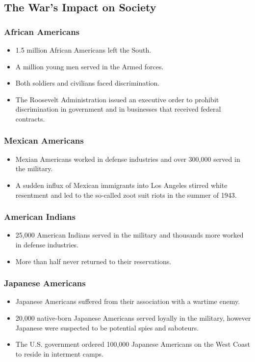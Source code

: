 \documentclass[12pt]{article} %
\begin{document}
	\subsection{The War's Impact on Society}

	\subsubsection{African Americans}
	\begin{itemize}
		\item 1.5 million African Americans left the South.
		\item A million young men served in the Armed forces.
		\item Both soldiers and civilians faced discrimination.
		\item The Roosevelt Administration issued an executive order to prohibit discrimination in government
			and in businesses that received federal contracts.
	\end{itemize}

	\subsubsection{Mexican Americans}
	\begin{itemize}
		\item Mexian Americans worked in defense industries and over 300,000 served in the military.
		\item A sudden influx of Mexican immigrants into Los Angeles stirred white resentment and 
			led to the so-called zoot suit riots in the summer of 1943.
	\end{itemize}

	\subsubsection{American Indians}
	\begin{itemize}
		\item 25,000 American Indians served in the military and thousands more worked in defense industries.
		\item More than half never returned to their reservations.
	\end{itemize}

	\subsubsection{Japanese Americans}
	\begin{itemize}
		\item Japanese Americans suffered from their association with a wartime enemy.
		\item 20,000 native-born Japanese Americans served loyally in the military, however Japanese were suspected
			to be potential spies and saboteurs.
		\item The U.S. government ordered 100,000 Japanese Americans on the West Coast to reside in interment camps.
	\end{itemize}
\end{document}
